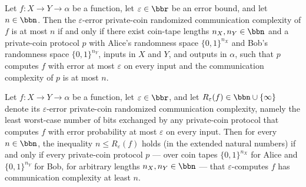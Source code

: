 \begin{theorem}
\label{CommunicationComplexity.PrivateCoin.communicationComplexity_le_iff}
\leanok
{}
Let $f : X \to Y \to \alpha$ be a function, let $\varepsilon \in \bbr$ be an error
bound, and let $n \in \bbn$. Then the $\varepsilon$-error private-coin randomized
communication complexity of $f$ is at most $n$ if and only if there exist coin-tape
lengths $n_X, n_Y \in \bbn$ and a private-coin protocol $p$ with Alice's randomness
space $\{0,1\}^{n_X}$ and Bob's randomness space $\{0,1\}^{n_Y}$, inputs in $X$ and $Y$,
and outputs in $\alpha$, such that $p$ computes $f$ with error at most $\varepsilon$ on
every input and the communication complexity of $p$ is at most $n$.
\end{theorem}

\begin{theorem}
\label{CommunicationComplexity.PrivateCoin.le_communicationComplexity_iff}
\leanok
{}
Let $f : X \to Y \to \alpha$ be a function, let $\varepsilon \in \bbr$, and let
$R_\varepsilon(f) \in \bbn \cup \{\infty\}$ denote its $\varepsilon$-error private-coin
randomized communication complexity, namely the least worst-case number of bits
exchanged by any private-coin protocol that computes $f$ with error probability at most
$\varepsilon$ on every input. Then for every $n \in \bbn$, the inequality $n \le
R_\varepsilon(f)$ holds (in the extended natural numbers) if and only if every
private-coin protocol $p$ — over coin tapes $\{0,1\}^{n_X}$ for Alice and
$\{0,1\}^{n_Y}$ for Bob, for arbitrary lengths $n_X, n_Y \in \bbn$ — that
$\varepsilon$-computes $f$ has communication complexity at least $n$.
\end{theorem}

